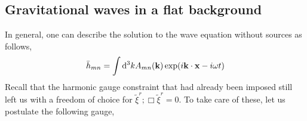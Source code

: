 \documentclass[a4paper,11pt]{article}
\begin{document}
\subsection{Gravitational waves in a flat background}
\begin{comment}
By symmetry considerations of the Riemann tensor and upto first order in perturbation, we can write,
\begin{equation*}
\Box R_{bcmn } = 8 \pi [\partial_b(\partial_m \bar{T}_{nc} - \partial_n \bar{T}_{mc} ) - \partial_c(\partial_m \bar{T}_{nb} - \partial_n \bar{T}_{mb} )] = 8 \pi \bar{T}_{bcmn}
\end{equation*}
where $ \bar{T}_{ij} = T_{ij} -\dfrac{g_{ij} T}{2} $. The equation in invariant under infinitesimal coordinate transformations. Let's first consider the vacuum case $ \Box R_{bcmn } =0 \implies R_{abmn} = C_{abmn} e^{i k_a x^a}, k^a k_a = 0$. The Bianchi identity gives,
\begin{equation*}
C_{bcmn} k_a + C_{camn}k_b + C_{abmn}k_c =0 
\end{equation*}
We now choose the wave-vector to be oriented along the $ z $-axis \textit{ie} $ k_a = (-\omega, 0 , 0 , \omega) $. Setting index $ c=0 $, we get
\begin{align*}
C_{abmn} = \dfrac{1}{\omega}(C_{b0mn} k_a + C_{0amn}k_b ) &= \dfrac{1}{\omega}(C_{b0mn} k_a - C_{a0mn}k_b ) \\
n \rightarrow 0 \implies C_{a0bm} &= \dfrac{1}{\omega}(C_{b0m0} k_a - C_{a0m0}k_b )
\end{align*}
Substituting the second equation into the first, we can figure that $ C_{abmn} $ can be specified completely in terms of the form $ C_{i0j0} $. Furthermore, substituting $a=0$ in the second equation gives,
\begin{align*}
 C_{00bm} &= \dfrac{1}{\omega}(C_{b0m0} (-\omega) - C_{00m0}k_b ) \implies C_{00m0}=0
\end{align*}
This means that $ i,j $ cannot be zero, and hence only the terms of the form $ C_{\alpha 0 \beta 0} $ survive this ordeal.
\end{comment}
In general, one can describe the solution to the wave equation without sources as follows,
\begin{equation*}
\bar{h}_{mn} = \int \dd^3{k} A_{mn}( \vb{k}) \exp(i \vb{k} \cdot \vb{x} - i \omega t)
\end{equation*}
Recall that the harmonic gauge constraint that had already been imposed still left us with a freedom of choice for $ \tilde{\xi}^r; \Box \tilde{\xi}^r =0 $. To take care of these, let us postulate the following gauge,
\end{document}
